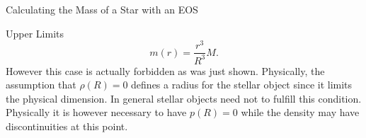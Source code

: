 \begin{section}{Calculating the Mass of a Star with an EOS}
\begin{subsection}{Upper Limits}
\begin{equation}
	m(r) = \frac{r^3}{R^3}M.
\end{equation}
However this case is actually forbidden as was just shown. Physically, the assumption that $\rho(R)=0$ defines a radius for the stellar object since it limits the physical dimension. In general stellar objects need not to fulfill this condition. Physically it is however necessary to have $p(R)=0$ while the density may have discontinuities at this point.
\end{subsection}
%
%
\end{section}
 
